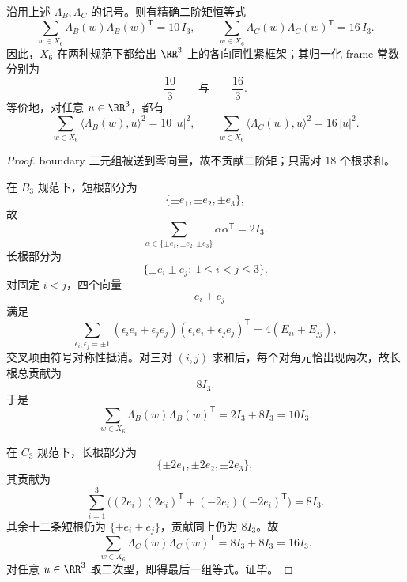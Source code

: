 \begin{theorem}\label{thm:window6-b3c3-adjoint-second-moment-isotropy}
沿用上述 \(\Lambda_B,\Lambda_C\) 的记号。则有精确二阶矩恒等式
\[
\sum_{w\in X_6}\Lambda_B(w)\Lambda_B(w)^{\mathsf T}=10\,I_3,
\qquad
\sum_{w\in X_6}\Lambda_C(w)\Lambda_C(w)^{\mathsf T}=16\,I_3.
\]
因此，\(X_6\) 在两种规范下都给出 \(\RR^3\) 上的各向同性紧框架；其归一化 frame 常数分别为
\[
\frac{10}{3}
\qquad\text{与}\qquad
\frac{16}{3}.
\]
等价地，对任意 \(u\in \RR^3\)，都有
\[
\sum_{w\in X_6}\langle \Lambda_B(w),u\rangle^2=10\,|u|^2,
\qquad
\sum_{w\in X_6}\langle \Lambda_C(w),u\rangle^2=16\,|u|^2.
\]
\end{theorem}
\begin{proof}
boundary 三元组被送到零向量，故不贡献二阶矩；只需对 \(18\) 个根求和。

在 \(B_3\) 规范下，短根部分为
\[
\{\pm e_1,\pm e_2,\pm e_3\},
\]
故
\[
\sum_{\alpha\in \{\pm e_1,\pm e_2,\pm e_3\}}
\alpha\alpha^{\mathsf T}
=2I_3.
\]
长根部分为
\[
\{\pm e_i\pm e_j:\ 1\le i<j\le 3\}.
\]
对固定 \(i<j\)，四个向量
\[
\pm e_i\pm e_j
\]
满足
\[
\sum_{\epsilon_i,\epsilon_j=\pm 1}
(\epsilon_i e_i+\epsilon_j e_j)(\epsilon_i e_i+\epsilon_j e_j)^{\mathsf T}
=4(E_{ii}+E_{jj}),
\]
交叉项由符号对称性抵消。对三对 \((i,j)\) 求和后，每个对角元恰出现两次，故长根总贡献为
\[
8I_3.
\]
于是
\[
\sum_{w\in X_6}\Lambda_B(w)\Lambda_B(w)^{\mathsf T}=2I_3+8I_3=10I_3.
\]

在 \(C_3\) 规范下，长根部分为
\[
\{\pm 2e_1,\pm 2e_2,\pm 2e_3\},
\]
其贡献为
\[
\sum_{i=1}^{3}\bigl((2e_i)(2e_i)^{\mathsf T}+(-2e_i)(-2e_i)^{\mathsf T}\bigr)=8I_3.
\]
其余十二条短根仍为 \(\{\pm e_i\pm e_j\}\)，贡献同上仍为 \(8I_3\)。故
\[
\sum_{w\in X_6}\Lambda_C(w)\Lambda_C(w)^{\mathsf T}=8I_3+8I_3=16I_3.
\]
对任意 \(u\in\RR^3\) 取二次型，即得最后一组等式。证毕。
\end{proof}

